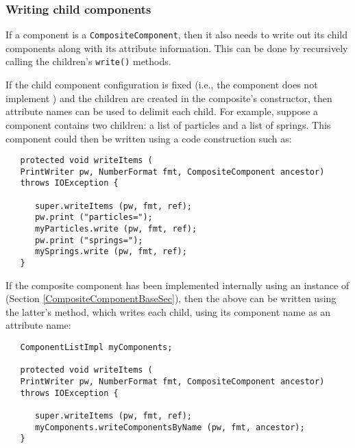 \documentclass{article}
\begin{document}
\subsubsection{Writing child components}
\label{writingChildrenSec}

If a component is a {\tt CompositeComponent}, then it also needs to write
out its child components along with its attribute information. This
can be done by recursively calling the children's {\tt write()} methods.

If the child component configuration is fixed (i.e., the component
does not implement
)
and the children are created in the composite's constructor,
then attribute names can be used to delimit each child. For example, suppose
a component contains two children: a list of particles and a
list of springs. This component could then be written using
a code construction such as:
\begin{lstlisting}
   protected void writeItems (
   PrintWriter pw, NumberFormat fmt, CompositeComponent ancestor) 
   throws IOException {

      super.writeItems (pw, fmt, ref);
      pw.print ("particles=");
      myParticles.write (pw, fmt, ref);
      pw.print ("springs=");
      mySprings.write (pw, fmt, ref);
   }   
\end{lstlisting}
If the composite component has been implemented internally using
an instance of 
(Section \ref{CompositeComponentBaseSec}), then the
above can be written using the latter's
method, which writes each child, using its component name as an attribute name:
\begin{lstlisting}
   ComponentListImpl myComponents; 

   protected void writeItems (
   PrintWriter pw, NumberFormat fmt, CompositeComponent ancestor) 
   throws IOException {

      super.writeItems (pw, fmt, ref);
      myComponents.writeComponentsByName (pw, fmt, ancestor);
   }   
\end{lstlisting}
\end{document}

